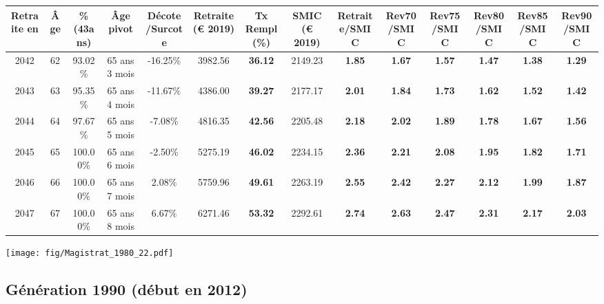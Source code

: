 \begin{adjustbox}{max width=\textwidth} 
\begin{tabular}[htb]{|c|c||c|c|c||c|c||c||c|c|c|c|c|c|} 
\hline 
 Retraite en &  Âge &  \%(43ans) &  Âge pivot &  Décote/Surcote &  Retraite (\euro{} 2019) &  Tx Rempl(\%) &  SMIC (\euro{} 2019) &  Retraite/SMIC &  Rev70/SMIC &  Rev75/SMIC &  Rev80/SMIC &  Rev85/SMIC &  Rev90/SMIC \\ 
\hline \hline 
 2042 &  62 &  93.02\% &  65 ans 3 mois &  -16.25\% &  3982.56 &  {\bf 36.12} &  2149.23 &  {\bf 1.85} &  {\bf 1.67} &  {\bf 1.57} &  {\bf 1.47} &  {\bf 1.38} &  {\bf 1.29} \\ 
\hline 
 2043 &  63 &  95.35\% &  65 ans 4 mois &  -11.67\% &  4386.00 &  {\bf 39.27} &  2177.17 &  {\bf 2.01} &  {\bf 1.84} &  {\bf 1.73} &  {\bf 1.62} &  {\bf 1.52} &  {\bf 1.42} \\ 
\hline 
 2044 &  64 &  97.67\% &  65 ans 5 mois &  -7.08\% &  4816.35 &  {\bf 42.56} &  2205.48 &  {\bf 2.18} &  {\bf 2.02} &  {\bf 1.89} &  {\bf 1.78} &  {\bf 1.67} &  {\bf 1.56} \\ 
\hline 
 2045 &  65 &  100.00\% &  65 ans 6 mois &  -2.50\% &  5275.19 &  {\bf 46.02} &  2234.15 &  {\bf 2.36} &  {\bf 2.21} &  {\bf 2.08} &  {\bf 1.95} &  {\bf 1.82} &  {\bf 1.71} \\ 
\hline 
 2046 &  66 &  100.00\% &  65 ans 7 mois &  2.08\% &  5759.96 &  {\bf 49.61} &  2263.19 &  {\bf 2.55} &  {\bf 2.42} &  {\bf 2.27} &  {\bf 2.12} &  {\bf 1.99} &  {\bf 1.87} \\ 
\hline 
 2047 &  67 &  100.00\% &  65 ans 8 mois &  6.67\% &  6271.46 &  {\bf 53.32} &  2292.61 &  {\bf 2.74} &  {\bf 2.63} &  {\bf 2.47} &  {\bf 2.31} &  {\bf 2.17} &  {\bf 2.03} \\ 
\hline 
\hline 
\end{tabular} 
\end{adjustbox} 
 
 \vspace{0.1cm} 

 \begin{center}\texttt{[image: fig/Magistrat\_1980\_22.pdf]}\end{center} \label{fig/Magistrat_1980_22.pdf} 

\newpage 
 
\subsection{Génération 1990 (début en 2012)} 

